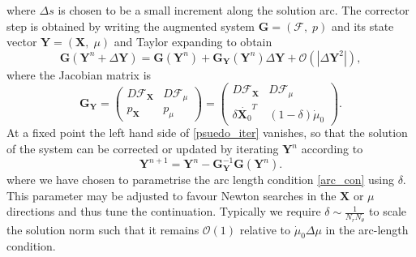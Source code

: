 \documentclass[a4paper]{article}
\begin{document}
where $\Delta s$ is chosen to be a small increment along the solution arc. The corrector step is obtained by writing the augmented system $\boldsymbol{G} = ( \boldsymbol{\mathcal{F}} , \; p )$ and its state vector $\boldsymbol{Y} = ( \boldsymbol{X} , \; \mu )$ and Taylor expanding to obtain 
\begin{equation}
\boldsymbol{G} ( \boldsymbol{Y}^n + \Delta \boldsymbol{Y} ) = \boldsymbol{G}(\boldsymbol{Y}^n) + \boldsymbol{G}_{\boldsymbol{Y}} (\boldsymbol{Y}^n) \Delta \boldsymbol{Y}  + \mathcal{O}(| \Delta \boldsymbol{Y}^2 |),
\label{psuedo_iter}
\end{equation}
where the Jacobian matrix is 
\begin{equation}
\boldsymbol{G}_{\boldsymbol{Y}} = \begin{pmatrix} D\mathcal{F}_{\boldsymbol{X}} &  D\boldsymbol{\mathcal{F}}_{\mu}  \\ p_{\boldsymbol{X}} & p_{\mu}   \end{pmatrix} = \begin{pmatrix} D \mathcal{F}_{\boldsymbol{X}} & D\boldsymbol{\mathcal{F}}_{\mu}  \\ \delta \dot{\boldsymbol{X}_0}^T & (1-\delta)\dot{\mu}_0   \end{pmatrix}. 
\end{equation}
At a fixed point the left hand side of \eqref{psuedo_iter} vanishes, so that the solution of the system can be corrected or updated by iterating $\boldsymbol{Y}^n$ according to  
\begin{equation}
\boldsymbol{Y}^{n+1} = \boldsymbol{Y}^n - \boldsymbol{G}^{-1}_{\boldsymbol{Y}} \boldsymbol{G}( \boldsymbol{Y}^n).
\end{equation}
where we have chosen to parametrise the arc length condition \eqref{arc_con} using $\delta$. This parameter may be adjusted to favour Newton searches in the $\boldsymbol{X}$ or $\mu$ directions and thus tune the continuation. Typically we require $\delta \sim \frac{1}{N_r N_{\theta}}$ to scale the solution norm such that it remains $\mathcal{O}(1)$ relative to $\dot{\mu}_0 \Delta \mu$ in the arc-length condition.




\end{document}
